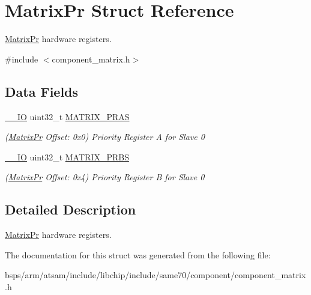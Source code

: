 \hypertarget{structMatrixPr}{}\section{Matrix\+Pr Struct Reference}
\label{structMatrixPr}


\mbox{\hyperlink{structMatrixPr}{Matrix\+Pr}} hardware registers.  




{\ttfamily \#include $<$component\+\_\+matrix.\+h$>$}

\subsection*{Data Fields}
\begin{DoxyCompactItemize}
\item 
\mbox{\label{structMatrixPr_afdb57936511e8eed6b8784a136cc792d}} 
\mbox{\hyperlink{core__cm7_8h_aec43007d9998a0a0e01faede4133d6be}{\+\_\+\+\_\+\+IO}} uint32\+\_\+t \mbox{\hyperlink{structMatrixPr_afdb57936511e8eed6b8784a136cc792d}{M\+A\+T\+R\+I\+X\+\_\+\+P\+R\+AS}}
\begin{DoxyCompactList}\small\item\em (\mbox{\hyperlink{structMatrixPr}{Matrix\+Pr}} Offset\+: 0x0) Priority Register A for Slave 0 \end{DoxyCompactList}\item 
\mbox{\label{structMatrixPr_a3d6ce49dbac5a71e465748353102073f}} 
\mbox{\hyperlink{core__cm7_8h_aec43007d9998a0a0e01faede4133d6be}{\+\_\+\+\_\+\+IO}} uint32\+\_\+t \mbox{\hyperlink{structMatrixPr_a3d6ce49dbac5a71e465748353102073f}{M\+A\+T\+R\+I\+X\+\_\+\+P\+R\+BS}}
\begin{DoxyCompactList}\small\item\em (\mbox{\hyperlink{structMatrixPr}{Matrix\+Pr}} Offset\+: 0x4) Priority Register B for Slave 0 \end{DoxyCompactList}\end{DoxyCompactItemize}


\subsection{Detailed Description}
\mbox{\hyperlink{structMatrixPr}{Matrix\+Pr}} hardware registers. 

The documentation for this struct was generated from the following file\+:\begin{DoxyCompactItemize}
\item 
bsps/arm/atsam/include/libchip/include/same70/component/component\+\_\+matrix.\+h\end{DoxyCompactItemize}
